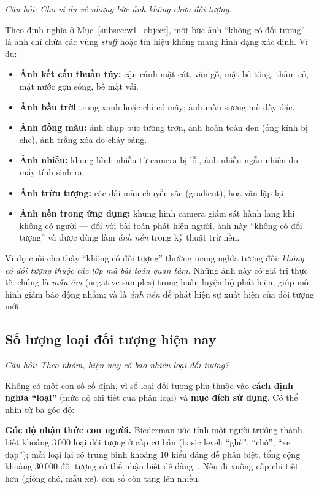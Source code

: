 \textit{Câu hỏi: Cho ví dụ về những bức ảnh không chứa đối tượng.}

Theo định nghĩa ở Mục~\ref{subsec:w1_object}, một bức ảnh ``không có đối tượng'' là ảnh chỉ chứa các vùng \emph{stuff} hoặc tín hiệu không mang hình dạng xác định. Ví dụ:
\begin{itemize}
    \item \textbf{Ảnh kết cấu thuần túy:} cận cảnh mặt cát, vân gỗ, mặt bê tông, thảm cỏ, mặt nước gợn sóng, bề mặt vải.
    \item \textbf{Ảnh bầu trời} trong xanh hoặc chỉ có mây; ảnh màn sương mù dày đặc.
    \item \textbf{Ảnh đồng màu:} ảnh chụp bức tường trơn, ảnh hoàn toàn đen (ống kính bị che), ảnh trắng xóa do cháy sáng.
    \item \textbf{Ảnh nhiễu:} khung hình nhiễu từ camera bị lỗi, ảnh nhiễu ngẫu nhiên do máy tính sinh ra.
    \item \textbf{Ảnh trừu tượng:} các dải màu chuyển sắc (gradient), hoa văn lặp lại.
    \item \textbf{Ảnh nền trong ứng dụng:} khung hình camera giám sát hành lang khi không có người — đối với bài toán phát hiện người, ảnh này ``không có đối tượng'' và được dùng làm \emph{ảnh nền} trong kỹ thuật trừ nền.
\end{itemize}

Ví dụ cuối cho thấy ``không có đối tượng'' thường mang nghĩa tương đối: \emph{không có đối tượng thuộc các lớp mà bài toán quan tâm}. Những ảnh này có giá trị thực tế: chúng là \emph{mẫu âm} (negative samples) trong huấn luyện bộ phát hiện, giúp mô hình giảm báo động nhầm; và là \emph{ảnh nền} để phát hiện sự xuất hiện của đối tượng mới.

\subsection{Số lượng loại đối tượng hiện nay}
\label{subsec:w1_numclasses}

\textit{Câu hỏi: Theo nhóm, hiện nay có bao nhiêu loại đối tượng?}

Không có một con số cố định, vì số loại đối tượng phụ thuộc vào \textbf{cách định nghĩa ``loại''} (mức độ chi tiết của phân loại) và \textbf{mục đích sử dụng}. Có thể nhìn từ ba góc độ:

\textbf{Góc độ nhận thức con người.} Biederman ước tính một người trưởng thành biết khoảng $3\,000$ loại đối tượng ở cấp cơ bản (basic level: ``ghế'', ``chó'', ``xe đạp''); mỗi loại lại có trung bình khoảng $10$ kiểu dáng dễ phân biệt, tổng cộng khoảng $30\,000$ đối tượng có thể nhận biết dễ dàng~\citep{biederman1987recognition}. Nếu đi xuống cấp chi tiết hơn (giống chó, mẫu xe), con số còn tăng lên nhiều.

